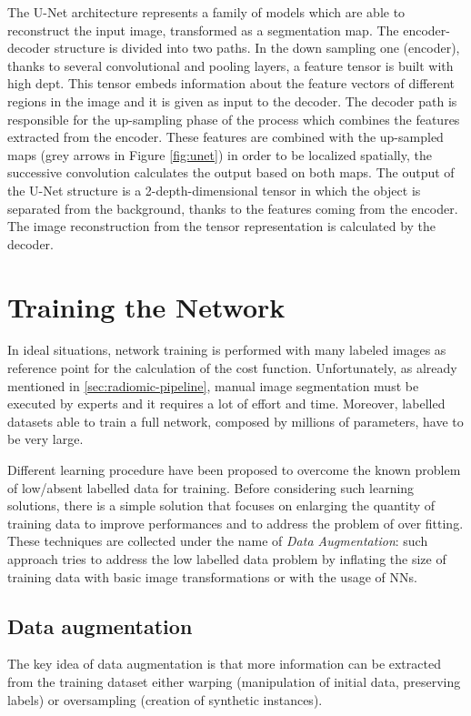 \documentclass[../main.tex]{subfiles}
\begin{document}
The U-Net architecture represents a family of models which are able to reconstruct the input image, transformed as a segmentation map.
The encoder-decoder structure is divided into two paths.
In the down sampling one (encoder), thanks to several convolutional and pooling layers, a feature tensor is built with high dept. 
This tensor embeds information about the feature vectors of different regions in the image and it is given as input to the decoder.
The decoder path is responsible for the up-sampling phase of the process which combines the features extracted from the encoder.
These features are combined with the up-sampled maps (grey arrows in Figure \ref{fig:unet}) in order to be localized spatially, the successive convolution calculates the output based on both maps. 
The output of the U-Net structure is a 2-depth-dimensional tensor in which the object is separated from the background, thanks to the features coming from the encoder.
The image reconstruction from the tensor representation is calculated by the decoder.


\section{Training the Network}

In ideal situations, network training is performed with many labeled images as reference point for the calculation of the cost function. 
Unfortunately, as already mentioned in \ref{sec:radiomic-pipeline}, manual image segmentation must be executed by experts and it requires a lot of effort and time.
Moreover, labelled datasets able to train a full network, composed by millions of parameters, have to be very large. 

Different learning procedure have been proposed to  overcome the known problem of low/absent labelled data for training.
Before considering such learning solutions, there is a simple solution that focuses on enlarging the quantity of training data to improve performances and to address the problem of over fitting.
These techniques are collected under the name of \textit{Data Augmentation}: such approach tries to address the low labelled data problem by inflating the size of training data with basic image transformations or with the usage of NNs.

\subsection{Data augmentation}

The key idea of data augmentation is that more information can be extracted from the training dataset either warping (manipulation of initial data, preserving labels) or oversampling (creation of synthetic instances).
\end{document}
